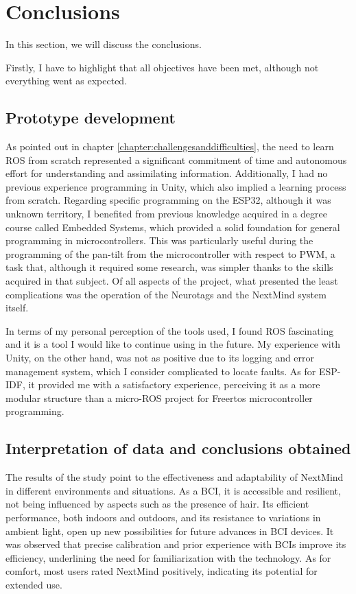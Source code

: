 \section{Conclusions}

In this section, we will discuss the conclusions.

Firstly, I have to highlight that all objectives have been met, although not everything went as expected.

\subsection{Prototype development}
As pointed out in chapter \ref{chapter:challengesanddifficulties}, the need to learn ROS from scratch represented a significant commitment of time and autonomous effort for understanding and assimilating information. Additionally, I had no previous experience programming in Unity, which also implied a learning process from scratch. Regarding specific programming on the ESP32, although it was unknown territory, I benefited from previous knowledge acquired in a degree course called Embedded Systems, which provided a solid foundation for general programming in microcontrollers. This was particularly useful during the programming of the pan-tilt from the microcontroller with respect to PWM, a task that, although it required some research, was simpler thanks to the skills acquired in that subject. Of all aspects of the project, what presented the least complications was the operation of the Neurotags and the NextMind system itself.

In terms of my personal perception of the tools used, I found ROS fascinating and it is a tool I would like to continue using in the future. My experience with Unity, on the other hand, was not as positive due to its logging and error management system, which I consider complicated to locate faults. As for ESP-IDF, it provided me with a satisfactory experience, perceiving it as a more modular structure than a micro-ROS project for Freertos microcontroller programming.

\subsection{Interpretation of data and conclusions obtained}
 
The results of the study point to the effectiveness and adaptability of NextMind in different environments and situations. As a BCI, it is accessible and resilient, not being influenced by aspects such as the presence of hair. Its efficient performance, both indoors and outdoors, and its resistance to variations in ambient light, open up new possibilities for future advances in BCI devices. It was observed that precise calibration and prior experience with BCIs improve its efficiency, underlining the need for familiarization with the technology. As for comfort, most users rated NextMind positively, indicating its potential for extended use.

